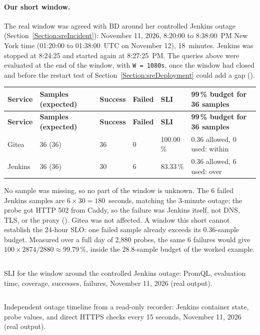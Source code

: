 \paragraph{Our short window.} The real window was agreed with BD around her controlled Jenkins outage
(Section~\ref{Section:sreIncident}): November 11, 2026, 8:20:00 to 8:38:00~PM New York time (01:20:00 to 01:38:00~UTC on
November 12), 18~minutes. Jenkins was stopped at 8:24:25 and started again at 8:27:25~PM. The queries above were evaluated
at the end of the window, with \texttt{W = 1080s}, once the window had closed and before the restart test of
Section~\ref{Section:sreDeployment} could add a gap ().

\begin{tabularx}{\linewidth}{L{2.0cm}L{2.0cm}L{1.6cm}L{1.6cm}L{1.6cm}Y}
\caption{SLI for the window 8:20--8:38~PM, November 11, 2026\label{Table:SreWindow}}\\
\toprule \textbf{Service} & \textbf{Samples (expected)} & \textbf{Success} & \textbf{Failed} & \textbf{SLI} & \textbf{99\,\% budget for 36 samples}\\ \midrule
\endfirsthead
\toprule \textbf{Service} & \textbf{Samples (expected)} & \textbf{Success} & \textbf{Failed} & \textbf{SLI} & \textbf{99\,\% budget for 36 samples}\\ \midrule
\endhead \bottomrule \endlastfoot
Gitea & 36 (36) & 36 & 0 & 100.00\,\% & 0.36 allowed, 0 used: within\\
Jenkins & 36 (36) & 30 & 6 & 83.33\,\% & 0.36 allowed, 6 used: over\\
\end{tabularx}

No sample was missing, so no part of the window is unknown. The 6 failed Jenkins samples are $6 \times 30 = 180$~seconds,
matching the 3-minute outage; the probe got HTTP 502 from Caddy, so the failure was Jenkins itself, not DNS, TLS, or the
proxy (). Gitea was not affected. A window this short cannot establish the 24-hour SLO: one failed sample
already exceeds its 0.36-sample budget. Measured over a full day of 2,880 probes, the same 6 failures would give
$100 \times 2874/2880 \approx 99.79\,\%$, inside the 28.8-sample budget of the worked example.

\begin{longlisting}
\inputminted[fontsize=\scriptsize]{text}{evidence/116-sli-window-around-controlled-jenkins-outage-sd-2026-11-11.txt}
\caption{SLI for the window around the controlled Jenkins outage: PromQL, evaluation time, coverage, successes, failures, November 11, 2026 (real output).}
\label{Listing:E116}
\end{longlisting}

\begin{longlisting}
\inputminted[fontsize=\scriptsize]{text}{evidence/117-outage-timeline-recorder-probe-and-container-state-sd-2026-11-11.txt}
\caption{Independent outage timeline from a read-only recorder: Jenkins container state, probe values, and direct HTTPS checks every 15 seconds, November 11, 2026 (real output).}
\label{Listing:E117}
\end{longlisting}
